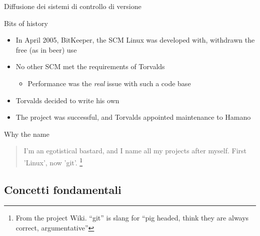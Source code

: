 \documentclass[xcolor=dvipsnames,presentation]{beamer}
\begin{document}
\begin{frame}[allowframebreaks]{Diffusione dei sistemi di controllo di versione}
\begin{center}
    \end{center}
\end{frame}

\begin{frame}[fragile]{Bits of history}
	\begin{itemize}
		\item In April 2005, BitKeeper, the SCM Linux was developed with, withdrawn the free (as in
beer) use
		\item No other SCM met the requirements of Torvalds
		\begin{itemize}
			\item Performance was the \textit{real} issue with such a code base
		\end{itemize}
		\item Torvalds decided to write his own
		\item The project was successful, and Torvalds appointed maintenance to Hamano
	\end{itemize}
	\begin{block}{Why the name}
		\begin{quote}
			I'm an egotistical bastard, and I name all my projects after myself. First 'Linux', now
'git'. \footnote{\tiny{From the project Wiki. ``git'' is slang for ``pig headed, think they are
always correct, argumentative''}}
			\begin{flushright}
			\end{flushright}
		\end{quote}
	\end{block}
\end{frame}

\subsection{Concetti fondamentali}
\end{document}
